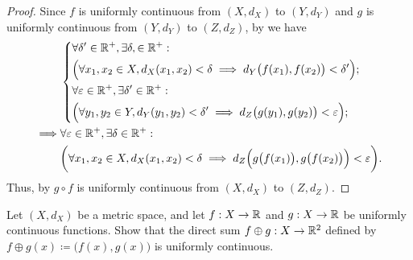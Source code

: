 \begin{proof}
  Since \(f\) is uniformly continuous from \((X, d_X)\) to \((Y, d_Y)\) and \(g\) is uniformly continuous from \((Y, d_Y)\) to \((Z, d_Z)\), by  we have
  \begin{align*}
             & \begin{dcases}
                 \forall \delta' \in \mathbb{R}^+, \exists \delta, \in \mathbb{R}^+ :                                                     \\
                 \Big(\forall x_1, x_2 \in X, d_X(x_1, x_2) < \delta \implies d_Y\big(f(x_1), f(x_2)\big) < \delta'\Big); \\
                 \forall \varepsilon \in \mathbb{R}^+, \exists \delta' \in \mathbb{R}^+ :                                                 \\
                 \Big(\forall y_1, y_2 \in Y, d_Y(y_1, y_2) < \delta' \implies d_Z\big(g(y_1), g(y_2)\big) < \varepsilon\Big);
               \end{dcases}                         \\
    \implies & \forall \varepsilon \in \mathbb{R}^+, \exists \delta \in \mathbb{R}^+ :                                                                              \\
             & \bigg(\forall x_1, x_2 \in X, d_X(x_1, x_2) < \delta \implies d_Z\Big(g\big(f(x_1)\big), g\big(f(x_2)\big)\Big) < \varepsilon\bigg).
  \end{align*}
  Thus, by  \(g \circ f\) is uniformly continuous from \((X, d_X)\) to \((Z, d_Z)\).
\end{proof}

\begin{ex}\label{ii:ex:2.3.5}
  Let \((X, d_X)\) be a metric space, and let \(f : X \to \mathbb{R}\) and \(g : X \to \mathbb{R}\) be uniformly continuous functions.
  Show that the direct sum \(f \oplus g : X \to \mathbb{R}^2\) defined by \(f \oplus g(x) \coloneqq \big(f(x), g(x)\big)\) is uniformly continuous.
\end{ex}

